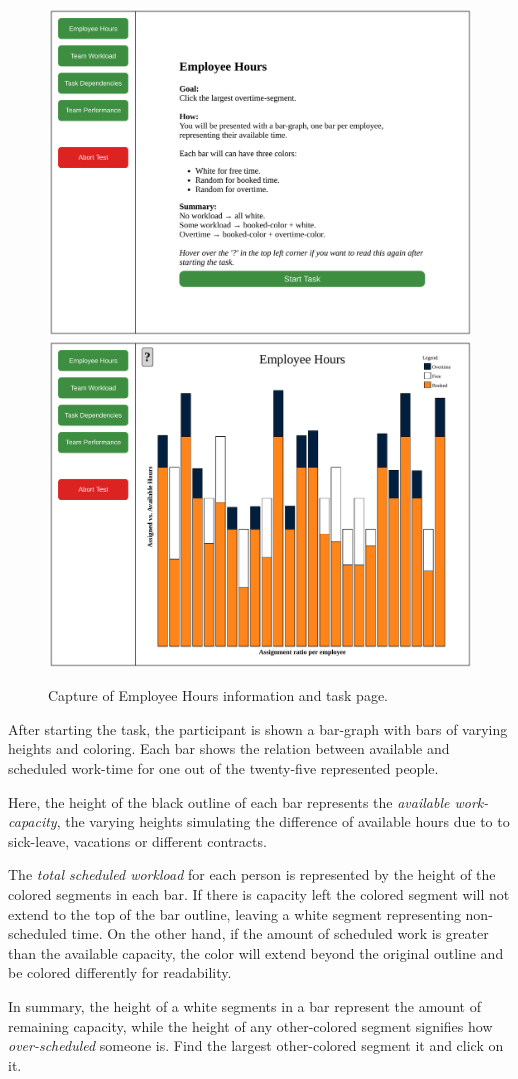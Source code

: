 {    \begin{figure}[h!]
      \centering
      \includegraphics[width=.49\textwidth]{figures/captures/webapp_employee_hours_info.pdf}
      \includegraphics[width=.49\textwidth]{figures/captures/webapp_employee_hours_task.pdf}
      \caption{Capture of Employee Hours information and task page.}
    \end{figure}

    After starting the task, the participant is shown a bar-graph with bars
    of varying heights and coloring. Each bar shows the relation between
    available and scheduled work-time for one out of the twenty-five
    represented people.

    Here, the height of the black outline of each bar represents the
    \textit{available work-capacity}, the varying heights simulating the
    difference of available hours due to to sick-leave, vacations or
    different contracts.

    The \textit{total scheduled workload} for
    each person is represented by the height of the colored segments in
    each bar. If there is capacity left the colored segment will not extend to the
    top of the bar outline, leaving a white segment representing
    non-scheduled time. On the other hand, if the amount of scheduled work
    is greater than the available capacity, the color will extend beyond
    the original outline and be colored differently for readability.

    In summary, the height of a white segments in a bar represent the
    amount of remaining capacity, while the height of any other-colored
    segment signifies how \textit{over-scheduled} someone is. Find the
    largest other-colored segment it and click on it.

}
